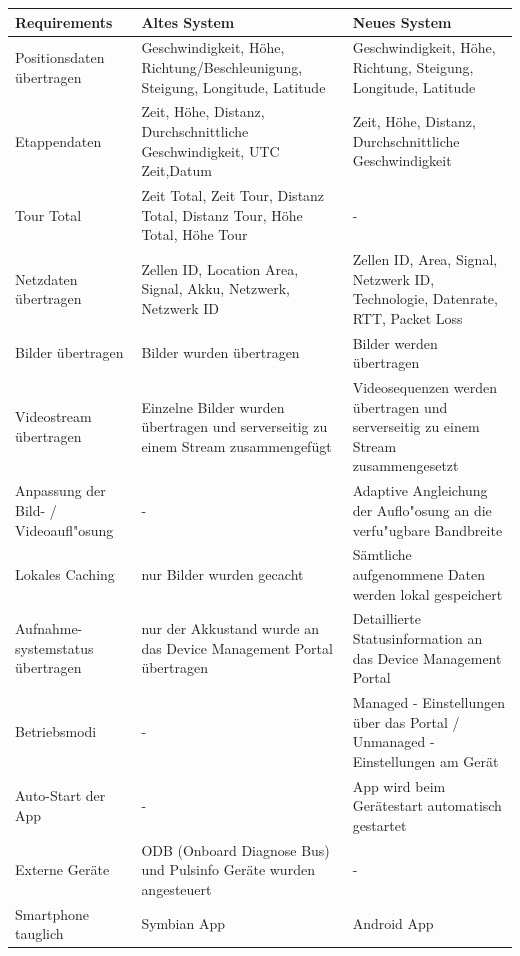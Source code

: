 {\renewcommand{\arraystretch}{2}%
    \begin{longtable}{  p{3.5cm} | p{4.3cm} | p{4.3cm} }
    
    \textbf{Requirements} & \textbf{Altes System} & \textbf{Neues System} \\ \hline
\hline
    Positionsdaten übertragen & Geschwindigkeit, H\"{o}he, Richtung/Beschleunigung, Steigung, Longitude, Latitude & Geschwindigkeit, H\"{o}he, Richtung, Steigung, Longitude, Latitude \\ \hline
    Etappendaten & Zeit, Höhe, Distanz, Durchschnittliche Geschwindigkeit, UTC Zeit,Datum & Zeit, Höhe, Distanz, Durchschnittliche Geschwindigkeit \\
    \hline
     Tour Total & Zeit Total, Zeit Tour, Distanz Total, Distanz Tour, Höhe Total, H\"{o}he Tour & - \\
    \hline
    Netzdaten übertragen & Zellen ID, Location Area, Signal, Akku, Netzwerk, Netzwerk ID & Zellen ID, Area, Signal, Netzwerk ID, Technologie, Datenrate, RTT, Packet Loss\\
    \hline
    Bilder \"{u}bertragen & Bilder wurden \"{u}bertragen & Bilder werden \"{u}bertragen\\
    \hline
    Videostream \"{u}bertragen & Einzelne Bilder wurden \"{u}bertragen und serverseitig zu einem Stream zusammengef\"{u}gt & Videosequenzen werden \"{u}bertragen und serverseitig zu einem Stream zusammengesetzt\\
    \hline
    Anpassung der Bild- / Videoaufl"osung & - & Adaptive Angleichung der Auflo"osung an die verfu"ugbare Bandbreite\\
    \hline
    Lokales Caching & nur Bilder wurden gecacht & S\"{a}mtliche aufgenommene Daten werden lokal gespeichert\\
    \hline
	Aufnahme- systemstatus \"{u}bertragen & nur der Akkustand wurde an das Device Management Portal \"{u}bertragen & Detaillierte Statusinformation an das Device Management Portal\\
    \hline    
    Betriebsmodi & - & Managed - Einstellungen \"{u}ber das Portal / Unmanaged - Einstellungen am Ger\"{a}t\\
    \hline
	Auto-Start der App & - & App wird beim Ger\"{a}testart automatisch gestartet\\
    \hline    
    Externe Ger\"{a}te & ODB (Onboard Diagnose Bus) und Pulsinfo Ger\"{a}te wurden angesteuert & -\\
    \hline  
    Smartphone tauglich & Symbian App & Android App\\

\end{longtable}}
